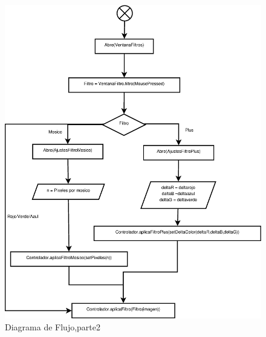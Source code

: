 \documentclass{article}
\begin{document}
\begin{figure}[h]
    \includegraphics[scale=.42]{images/Diagrama2.eps} 
    \caption{Diagrama de Flujo,parte2}
\end{figure}
\end{document}
